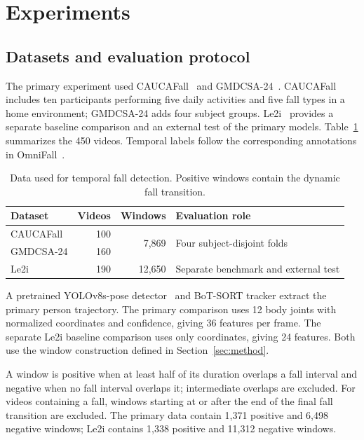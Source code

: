\section{Experiments}
\label{sec:experiments}

\subsection{Datasets and evaluation protocol}

The primary experiment used CAUCAFall~\cite{guerrero2022caucafall,caucafallDatasetV5} and GMDCSA-24~\cite{alam2024gmdcsa,gmdcsaDatasetV2}. CAUCAFall includes ten participants performing five daily activities and five fall types in a home environment; GMDCSA-24 adds four subject groups. Le2i~\cite{charfi2012le2i,yu2025tcnte} provides a separate baseline comparison and an external test of the primary models. Table~\ref{tab:datasets} summarizes the 450 videos. Temporal labels follow the corresponding annotations in OmniFall~\cite{omnifallDataset2026}.

\begin{table}[!ht]
    \centering
    \small
    \caption{Data used for temporal fall detection. Positive windows contain the dynamic fall transition.}
    \label{tab:datasets}
    \begin{tabularx}{\columnwidth}{lrrX}
        \toprule
        Dataset & Videos & Windows & Evaluation role \\
        \midrule
        CAUCAFall & 100 & \multirow{2}{*}{7,869} & \multirow{2}{=}{Four subject-disjoint folds} \\
        GMDCSA-24 & 160 & & \\
        Le2i & 190 & 12,650 & Separate benchmark and external test \\
        \bottomrule
    \end{tabularx}
\end{table}


A pretrained YOLOv8s-pose detector~\cite{ultralyticsPose} and BoT-SORT tracker extract the primary person trajectory. The primary comparison uses 12 body joints with normalized coordinates and confidence, giving 36 features per frame. The separate Le2i baseline comparison uses only coordinates, giving 24 features. Both use the window construction defined in Section~\ref{sec:method}.

A window is positive when at least half of its duration overlaps a fall interval and negative when no fall interval overlaps it; intermediate overlaps are excluded. For videos containing a fall, windows starting at or after the end of the final fall transition are excluded. The primary data contain 1,371 positive and 6,498 negative windows; Le2i contains 1,338 positive and 11,312 negative windows.

